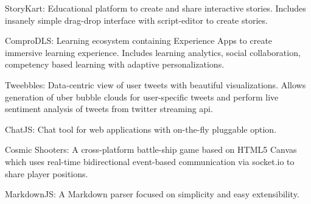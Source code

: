 

\begin{cventries}
  \begin{cvitems} %
    \item {StoryKart: Educational platform to create and share interactive stories. Includes insanely simple drag-drop interface with script-editor to create stories.}
    \item {ComproDLS: Learning ecosystem containing Experience Apps to create immersive learning experience. Includes learning analytics, social collaboration, competency based learning with adaptive personalizations.}
    \item {Tweebbles: Data-centric view of user tweets with beautiful visualizations. Allows generation of uber bubble clouds for user-specific tweets and perform live sentiment analysis of tweets from twitter streaming api.}
    \item {ChatJS: Chat tool for web applications with on-the-fly pluggable option.}
    \item {Cosmic Shooters: A cross-platform battle-ship game based on HTML5 Canvas which uses real-time bidirectional event-based communication via socket.io to share player positions.}
    \item {MarkdownJS: A Markdown parser focused on simplicity and easy extensibility.}
  \end{cvitems}

\end{cventries}

